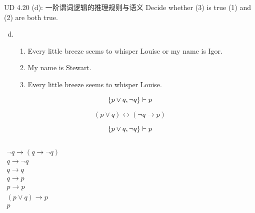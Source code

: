 \begin{frame}{}
  \begin{exampleblock}{UD 4.20 (d): 一阶谓词逻辑的推理规则与语义}
    Decide whether (3) is true  (1) and (2) are both true.

    \begin{enumerate}[(a)]
      \setcounter{enumi}{3}
      \item 
	\begin{enumerate}[(1)]
	  \item Every little breeze seems to whisper Louise or my name is Igor.
	  \item My name is Stewart.
	  \item Every little breeze seems to whisper Louise.
	\end{enumerate}
    \end{enumerate}
  \end{exampleblock}

  \pause
  \begin{center}

    \pause
    \[
      \{p \lor q, \lnot q\} \vdash p
    \]

    \pause
    \[
      (p \lor q) \leftrightarrow (\lnot q \to p)
    \]
  \end{center}
\end{frame}

\begin{frame}{}
  \[
    \{p \lor q, \lnot q\} \vdash p
  \]

  \setcounter{equation}{0}
  \begin{columns}
      \begin{gather}
	\lnot q \to (q \to \lnot q) \\
	q \to \lnot q \\
	q \to q \\
	q \to p \\
	p \to p \\
	(p \lor q) \to p \\
	p
      \end{gather}
  \end{columns}
\end{frame}

